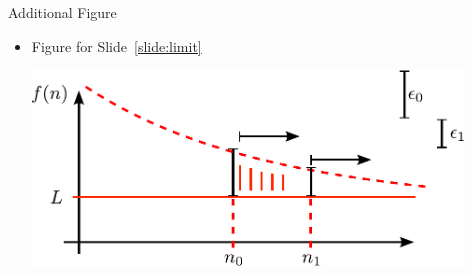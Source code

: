 
\begin{frame}{Additional Figure}
  \begin{itemize}
  \item
    Figure for Slide~\ref{slide:limit}
    \begin{center}
      \includegraphics[width=0.9\textwidth]{Images/limits-epsilon.pdf}
    \end{center}
  \end{itemize}
\end{frame}

